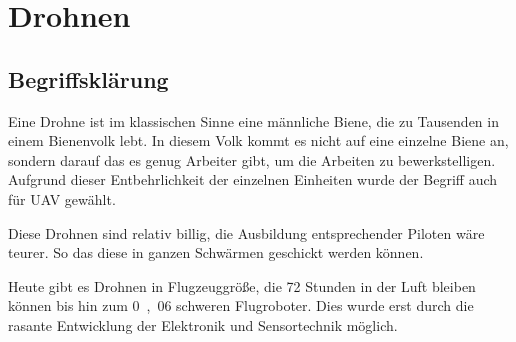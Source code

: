 \section{Drohnen}
\label{sec:drohnen}

\subsection{Begriffsklärung}
\label{subsec:drohnen:begriffskläaerung}

Eine Drohne ist im klassischen Sinne eine männliche Biene, die zu Tausenden in einem Bienenvolk lebt.
In diesem Volk kommt es nicht auf eine einzelne Biene an, sondern darauf das es genug Arbeiter gibt, um die Arbeiten zu bewerkstelligen.
Aufgrund dieser Entbehrlichkeit der einzelnen Einheiten wurde der Begriff auch für
\ac{UAV} gewählt.

Diese Drohnen sind relativ billig, die Ausbildung entsprechender Piloten wäre teurer.
So das diese in ganzen Schwärmen geschickt werden können.


Heute gibt es Drohnen in Flugzeuggröße,
die 72 Stunden in der Luft bleiben können bis hin zum \unit{0{,}06}{\gram} schweren Flugroboter.
Dies wurde erst durch die rasante Entwicklung der Elektronik und Sensortechnik möglich.

\begin{comment}
\begin{figurewrapper}	%
	\texttt{[image: files/images/Drohnen/image-139405-topicbig-oxxa-spiegel]}
	\captionof{figure}[Unbemannte Drohne der US Air Force]{Unbemannte Drohne der US-Luftwaffe (RQ-4 Global Hawk)
		\newline Quelle: \url{http://www.spiegel.de/thema/drohnen/} (abgerufen am 12.\,06.\,2011)}
\end{figurewrapper}
\end{comment}

